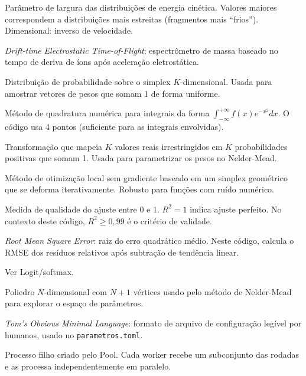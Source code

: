 \documentclass[12pt,a4paper]{report}
\begin{document}
\begin{description}[leftmargin=2.5em, style=nextline]
  \item[\textbf{Beta ($\beta$)}]
    Parâmetro de largura das distribuições de energia cinética. Valores
    maiores correspondem a distribuições mais estreitas (fragmentos mais
    ``frios''). Dimensional: inverso de velocidade.

  \item[\textbf{DETOF}]
    \textit{Drift-time Electrostatic Time-of-Flight}: espectrômetro de
    massa baseado no tempo de deriva de íons após aceleração eletrostática.

  \item[\textbf{Dirichlet}]
    Distribuição de probabilidade sobre o simplex $K$-dimensional. Usada
    para amostrar vetores de pesos que somam 1 de forma uniforme.

  \item[\textbf{Gauss-Hermite}]
    Método de quadratura numérica para integrais da forma
    $\int_{-\infty}^{+\infty} f(x) e^{-x^2} dx$. O código usa 4 pontos
    (suficiente para as integrais envolvidas).

  \item[\textbf{Logit/softmax}]
    Transformação que mapeia $K$ valores reais irrestringidos em $K$ probabilidades
    positivas que somam 1. Usada para parametrizar os pesos no Nelder-Mead.

  \item[\textbf{Nelder-Mead}]
    Método de otimização local sem gradiente baseado em um simplex geométrico
    que se deforma iterativamente. Robusto para funções com ruído numérico.

  \item[\textbf{R² (coeficiente de determinação)}]
    Medida de qualidade do ajuste entre 0 e 1. $R^2 = 1$ indica ajuste perfeito.
    No contexto deste código, $R^2 \geq 0{,}99$ é o critério de validade.

  \item[\textbf{RMSE}]
    \textit{Root Mean Square Error}: raiz do erro quadrático médio.
    Neste código, calcula o RMSE dos resíduos relativos após subtração de
    tendência linear.

  \item[\textbf{Softmax}]
    Ver Logit/softmax.

  \item[\textbf{Simplex (Nelder-Mead)}]
    Poliedro $N$-dimensional com $N+1$ vértices usado pelo método de
    Nelder-Mead para explorar o espaço de parâmetros.

  \item[\textbf{TOML}]
    \textit{Tom's Obvious Minimal Language}: formato de arquivo de
    configuração legível por humanos, usado no \texttt{parametros.toml}.

  \item[\textbf{Worker (multiprocessing)}]
    Processo filho criado pelo Pool. Cada worker recebe um subconjunto
    das rodadas e as processa independentemente em paralelo.
\end{description}
\end{document}
